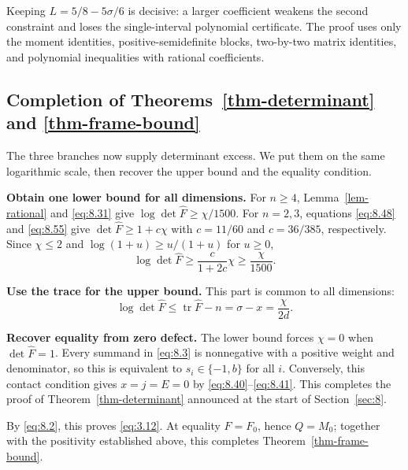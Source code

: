 Keeping $L=5/8-5\sigma/6$ is decisive: a larger coefficient weakens the second constraint and loses the single-interval polynomial certificate. The proof uses only the moment identities, positive-semidefinite blocks, two-by-two matrix identities, and polynomial inequalities with rational coefficients.

\subsection{Completion of Theorems~\ref{thm-determinant} and \ref{thm-frame-bound}}\label{sec:8.6}

The three branches now supply determinant excess. We put them on the same
logarithmic scale, then recover the upper bound and the equality condition.

\textbf{Obtain one lower bound for all dimensions.}
For $n\ge4$, Lemma~\ref{lem-rational} and \eqref{eq:8.31} give $\log\det\widehat F\ge\chi/1500$.
For $n=2,3$, equations \eqref{eq:8.48} and \eqref{eq:8.55} give $\det\widehat F\ge1+c\chi$ with $c=11/60$ and $c=36/385$, respectively. Since $\chi\le2$ and $\log(1+u)\ge u/(1+u)$ for $u\ge0$,
\begin{equation}\label{eq:8.66}
\log\det\widehat F\ge\frac{c}{1+2c}\chi\ge\frac{\chi}{1500}.
\end{equation}

\textbf{Use the trace for the upper bound.} This part is common to all dimensions:
\begin{equation}\label{eq:8.67}
\log\det\widehat F\le\operatorname{tr}\widehat F-n
=\sigma-x=\frac{\chi}{2d}.
\end{equation}

\textbf{Recover equality from zero defect.} The lower bound forces $\chi=0$ when
$\det\widehat F=1$. Every summand in \eqref{eq:8.3} is nonnegative with a positive weight
and denominator, so this is equivalent to $s_i\in\{-1,b\}$ for all $i$.
Conversely, this contact condition gives $x=j=E=0$ by \eqref{eq:8.40}--\eqref{eq:8.41}.
This completes the proof of Theorem~\ref{thm-determinant} announced at the start of Section~\ref{sec:8}.

By \eqref{eq:8.2}, this proves \eqref{eq:3.12}. At equality $F=F_0$, hence $Q=M_0$; together with the positivity established above, this completes Theorem~\ref{thm-frame-bound}.
